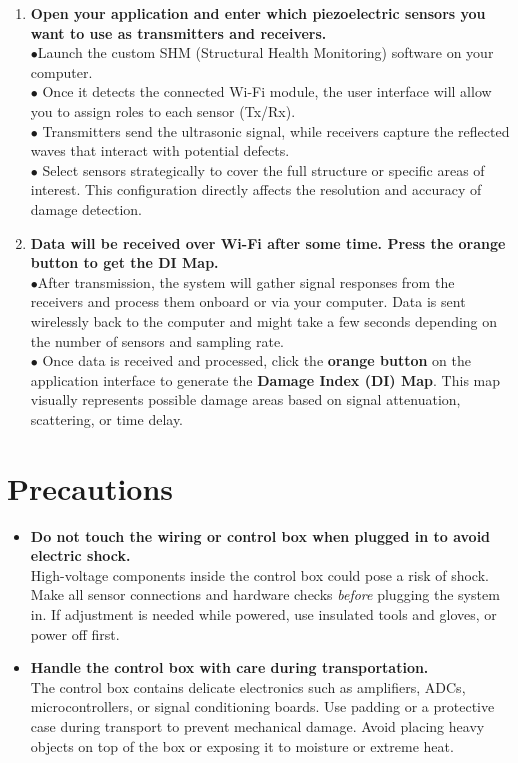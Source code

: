 \documentclass[12pt]{article}
\begin{document}
\begin{enumerate}[label=\textbf{Step \arabic*:}, leftmargin=2.5em]
\item \textbf{Open your application and enter which piezoelectric sensors you want to use as transmitters and receivers.} \\
$\bullet$Launch the custom SHM (Structural Health Monitoring) software on your computer.\\$\bullet$ Once it detects the connected Wi-Fi module, the user interface will allow you to assign roles to each sensor (Tx/Rx).\\$\bullet$ Transmitters send the ultrasonic signal, while receivers capture the reflected waves that interact with potential defects.\\$\bullet$ Select sensors strategically to cover the full structure or specific areas of interest. This configuration directly affects the resolution and accuracy of damage detection.\\

\item \textbf{Data will be received over Wi-Fi after some time. Press the orange button to get the DI Map.} \\
$\bullet$After transmission, the system will gather signal responses from the receivers and process them onboard or via your computer. Data is sent wirelessly back to the computer and might take a few seconds depending on the number of sensors and sampling rate.\\$\bullet$ Once data is received and processed, click the \textbf{orange button} on the application interface to generate the \textbf{Damage Index (DI) Map}. This map visually represents possible damage areas based on signal attenuation, scattering, or time delay.

\end{enumerate}

\section*{Precautions}

\begin{itemize}
    \item \textbf{Do not touch the wiring or control box when plugged in to avoid electric shock.} \\
    High-voltage components inside the control box could pose a risk of shock. Make all sensor connections and hardware checks \textit{before} plugging the system in. If adjustment is needed while powered, use insulated tools and gloves, or power off first.

    \item \textbf{Handle the control box with care during transportation.} \\
    The control box contains delicate electronics such as amplifiers, ADCs, microcontrollers, or signal conditioning boards. Use padding or a protective case during transport to prevent mechanical damage. Avoid placing heavy objects on top of the box or exposing it to moisture or extreme heat.
\end{itemize}
\end{document}
